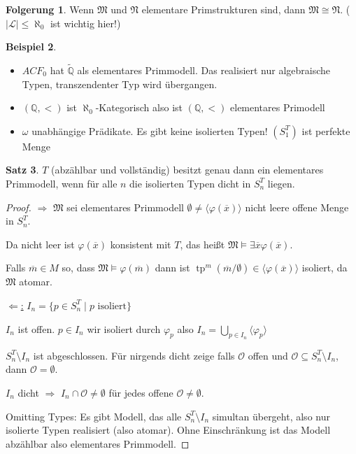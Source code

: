 \documentclass[12pt,parskip=full]{scrartcl}
\newcommand{\setQ}{\mathbb{Q}}
\newcommand{\abs}[1]{{\left| #1 \right|}}
\newcommand{\heading}{\underline}
\theoremstyle{definition}
\newtheorem{theorem}{Satz}[section]
\newtheorem{corollary}[theorem]{Folgerung}
\newtheorem{example}[theorem]{Beispiel}
\begin{document}
	\begin{corollary}
		Wenn $\mathfrak{M}$ und $\mathfrak{N}$ elementare Primstrukturen sind, dann $\mathfrak{M} \cong \mathfrak{N}$. ($\abs{\mathcal{L}} \leq \aleph_0$ ist wichtig hier!)
	\end{corollary}

	\begin{example}
		\begin{itemize}
			\item $ACF_0$ hat $\tilde{\setQ}$ als elementares Primmodell. Das realisiert nur algebraische Typen, transzendenter Typ wird übergangen.
			\item $(\setQ, <)$ ist $\aleph_0$-Kategorisch also ist $(\setQ, <)$ elementares Primodell
			\item $\omega$ unabhängige Prädikate. Es gibt keine isolierten Typen! $(S_1^T)$ ist perfekte Menge
		\end{itemize}
	\end{example}

	\begin{theorem}
		$T$ (abzählbar und vollständig) besitzt genau dann ein elementares Primmodell, wenn für alle $n$ die isolierten Typen dicht in $S_n^T$ liegen.
	\end{theorem}

	\begin{proof}
		\heading{$\Rightarrow$} $\mathfrak{M}$ sei elementares Primmodell $\emptyset \neq \langle \varphi(\overline{x}) \rangle$ nicht leere offene Menge in $S_n^T$.
		
		Da nicht leer ist $\varphi(\overline{x})$ konsistent mit $T$, das heißt $\mathfrak{M} \models \exists \overline{x} \varphi(\overline{x})$.
		
		Falls $\overline{m} \in M$ so, dass $\mathfrak{M} \models \varphi(\overline{m})$ dann ist $\operatorname{tp}^m(\overline{m} / \emptyset) \in \langle \varphi(\overline{x}) \rangle$ isoliert, da $\mathfrak{M}$ atomar.
		
		\heading{$\Leftarrow$:} $I_n = \{ p \in S_n^T \mid p \text{ isoliert} \}$
		
		$I_n$ ist offen. $p \in I_n$ wir isoliert durch $\varphi_p$ also $I_n = \bigcup_{p \in I_n} \langle \varphi_p \rangle$
		
		$S_n^T \setminus I_n$ ist abgeschlossen. Für nirgends dicht zeige falls $\mathcal{O}$ offen und $\mathcal{O} \subseteq S_n^T \setminus I_n$, dann $\mathcal{O} = \emptyset$.
		
		$I_n$ dicht $\Rightarrow$ $I_n \cap \mathcal{O}\neq \emptyset$ für jedes offene $\mathcal{O} \neq \emptyset$.
		
		Omitting Types: Es gibt Modell, das alle $S_n^T \setminus I_n$ simultan übergeht, also nur isolierte Typen realisiert (also atomar). Ohne Einschränkung ist das Modell abzählbar also elementares Primmodell.
	\end{proof}
\end{document}
